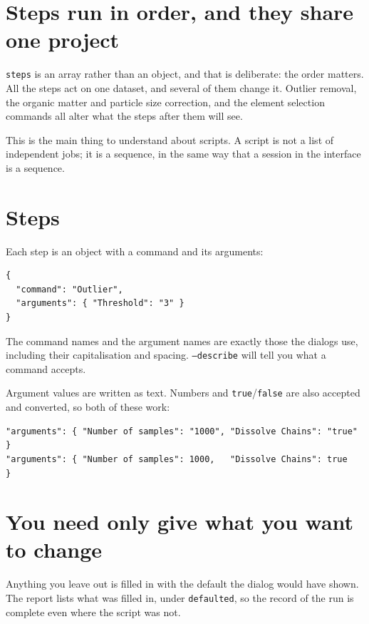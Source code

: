 \documentclass[11pt,a4paper]{report}
\begin{document}
\section{Steps run in order, and they share one project}

\texttt{steps} is an array rather than an object, and that is deliberate: the
order matters. All the steps act on one dataset, and several of them change
it. Outlier removal, the organic matter and particle size correction, and the
element selection commands all alter what the steps after them will see.

This is the main thing to understand about scripts. A script is not a list of
independent jobs; it is a sequence, in the same way that a session in the
interface is a sequence.

\section{Steps}

Each step is an object with a command and its arguments:

\begin{lstlisting}[language=scriptjson]
{
  "command": "Outlier",
  "arguments": { "Threshold": "3" }
}
\end{lstlisting}

The command names and the argument names are exactly those the dialogs use,
including their capitalisation and spacing. \texttt{--describe} will tell you
what a command accepts.

Argument values are written as text. Numbers and \texttt{true}/\texttt{false}
are also accepted and converted, so both of these work:

\begin{lstlisting}[language=scriptjson]
"arguments": { "Number of samples": "1000", "Dissolve Chains": "true"  }
"arguments": { "Number of samples": 1000,   "Dissolve Chains": true    }
\end{lstlisting}

\section{You need only give what you want to change}

Anything you leave out is filled in with the default the dialog would have
shown. The report lists what was filled in, under \texttt{defaulted}, so the
record of the run is complete even where the script was not.
\end{document}
